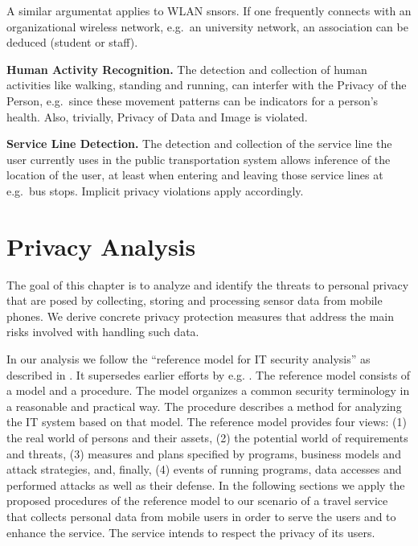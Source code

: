 \documentclass[runningheads,a4paper]{llncs}
\newenvironment{LGContent-Hidden}{ \comment  }{ }
\begin{document}
\begin{LGContent-Hidden}
A similar argumentat applies to WLAN snsors. If one frequently connects with an organizational wireless network, e.g.~an university network, an association can be deduced (student or staff).

\textbf{Human Activity Recognition.}
The detection and collection of human activities like walking, standing and running, can interfer with the Privacy of the Person, e.g.~since these movement patterns can be indicators for a person's health. Also, trivially, Privacy of Data and Image is violated.

\textbf{Service Line Detection.}
The detection and collection of the service line the user currently uses in the public transportation system allows inference of the location of the user, at least when entering and leaving those service lines at e.g.~bus stops.
Implicit privacy violations apply accordingly.

\end{LGContent-Hidden}









\section{Privacy Analysis}
\label{sec:privacyanalysis}

The goal of this chapter is to analyze and identify the threats to personal privacy that are posed by collecting, storing and processing sensor data from mobile phones. We derive concrete privacy protection measures that address the main risks involved with handling such data.

In our analysis we follow the “reference model for IT security analysis” as described in \cite{Grimm:ItSecRefModel}. It supersedes earlier efforts by e.g. \cite{Avizienis}. The reference model consists of a model and a procedure. The model organizes a common security terminology in a reasonable and practical way. The procedure describes a method for analyzing the IT system based on that model. The reference model provides four views: (1) the real world of persons and their assets, (2) the potential world of requirements and threats, (3) measures and plans specified by programs, business models and attack strategies, and, finally, (4) events of running programs, data accesses and performed attacks as well as their defense. In the following sections we apply the proposed procedures of the reference model to our scenario of a travel service that collects personal data from mobile users in order to serve the users and to enhance the service. The service intends to respect the privacy of its users. 
\end{document}
